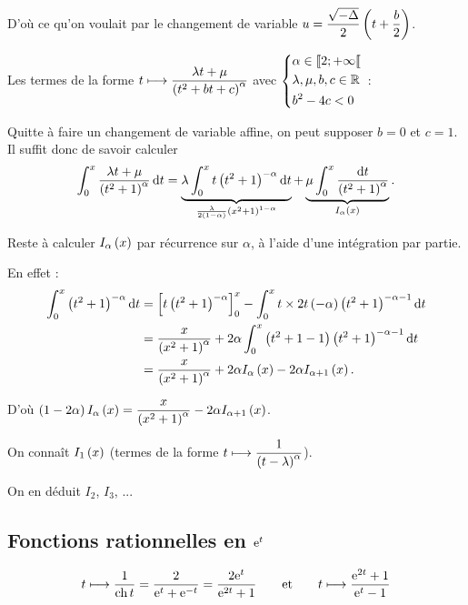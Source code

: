 \begin{dem}
D'où ce qu'on voulait par le changement de variable \(u=\dfrac{\sqrt{-\Delta}}{2}\left(t+\dfrac{b}{2}\right)\).

Les termes de la forme \(t\longmapsto\dfrac{\lambda t+\mu}{\left(t^2+bt+c\right)^{\alpha}}\) avec \(\begin{dcases}\alpha\in\left\llbracket2;+\infty\right\llbracket \\ \lambda,\mu,b,c\in\mathbb{R} \\ b^2-4c<0\end{dcases}\) :

Quitte à faire un changement de variable affine, on peut supposer \(b=0\) et \(c=1\). Il suffit donc de savoir calculer \[\int_0^x\dfrac{\lambda t+\mu}{\paren{t^2+1}^{\alpha}}\odif{t}=\underbrace{\lambda\int_0^xt\paren{t^2+1}^{-\alpha}\odif{t}}_{\frac{\lambda}{2\paren{1-\alpha}}\paren{x^2+1}^{1-\alpha}}+\underbrace{\mu\int_0^x\dfrac{\odif{t}}{\paren{t^2+1}^{\alpha}}}_{I_\alpha\paren{x}}.\]

Reste à calculer \(I_\alpha\left(x\right)\) par récurrence sur \(\alpha\), à l'aide d'une intégration par partie.

En effet : \[\begin{aligned}
\int_0^x\paren{t^2+1}^{-\alpha}\odif{t}&=\croch{t\paren{t^2+1}^{-\alpha}}_0^x-\int_0^xt\times2t\paren{-\alpha}\paren{t^2+1}^{-\alpha-1}\odif{t} \\
&=\dfrac{x}{\paren{x^2+1}^{\alpha}}+2\alpha\int_0^x\paren{t^2+1-1}\paren{t^2+1}^{-\alpha-1}\odif{t} \\
&=\dfrac{x}{\paren{x^2+1}^{\alpha}}+2\alpha I_\alpha\paren{x}-2\alpha I_{\alpha+1}\paren{x}.
\end{aligned}\]

D'où \(\left(1-2\alpha\right)I_\alpha\left(x\right)=\dfrac{x}{\left(x^2+1\right)^{\alpha}}-2\alpha I_{\alpha+1}\left(x\right)\).

On connaît \(I_1\left(x\right)\) (\cf termes de la forme \(t\longmapsto\dfrac{1}{\left(t-\lambda\right)^{\alpha}}\)).

On en déduit \(I_2\), \(I_3\), ...
\end{dem}

\subsection{Fonctions rationnelles en \(\mathrm{e}^{t}\)}

\begin{ex}
\[t\longmapsto\dfrac{1}{\operatorname{ch} t}=\dfrac{2}{\mathrm{e}^{t}+\mathrm{e}^{-t}}=\dfrac{2\mathrm{e}^{t}}{\mathrm{e}^{2t}+1}\qquad\text{et}\qquad t\longmapsto\dfrac{\mathrm{e}^{2t}+1}{\mathrm{e}^{t}-1}\]
\end{ex}


